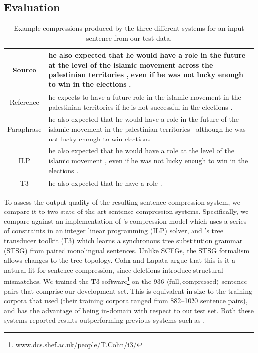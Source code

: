 \documentclass[11pt]{article}
\begin{document}
\subsection{Evaluation} \label{evaluation}

\begin{table}
\begin{center}
\small
\begin{tabular}{|c|p{13.2cm}|}
  \hline
  Source & he also expected that he would have a role in the future at
  the level of the islamic movement across the palestinian territories
  , even if he was not lucky enough to win in the elections . \\
  \hline
  Reference & he expects to have a future role in the islamic movement
  in the palestinian territories if he is not successful in the
  elections . \\
  \hline
  Paraphrase & he also expected that he would have a role in the future
  of the islamic movement in the palestinian territories , although he
  was not lucky enough to win elections . \\
  \hline
  ILP & he also expected that he would have a role at the level of the
  islamic movement , even if he was not lucky enough to win in the
  elections . \\
  \hline
  T3 & he also expected that he have a role . \\
  \hline
\end{tabular}
\normalsize
\end{center}
\caption{Example compressions produced by the three different systems
  for an input sentence from our test data.}
\label{test_examples}
\end{table}

To assess the output quality of the resulting sentence compression
system, we compare it to two state-of-the-art sentence compression
systems.  Specifically, we compare against an implementation of
's compression model which uses a series of
constraints in an integer linear programming (ILP) solver, and
's tree transducer toolkit (T3) which learns a
synchronous tree substitution grammar (STSG) from paired monolingual
sentences.  Unlike SCFGs, the STSG formalism allows changes to the
tree topology. Cohn and Lapata argue that this is it a natural fit for
sentence compression, since deletions introduce structural mismatches.
We trained the T3
software\footnote{\url{www.dcs.shef.ac.uk/people/T.Cohn/t3/}} on the
936 $\langle\text{full}, \text{compressed}\rangle$ sentence pairs that
comprise our development set.  This is equivalent in size to the
training corpora that  used (their training corpora
ranged from 882--1020 sentence pairs), and has the advantage of being
in-domain with respect to our test set.  Both these systems reported
results outperforming previous systems such as .
\end{document}
